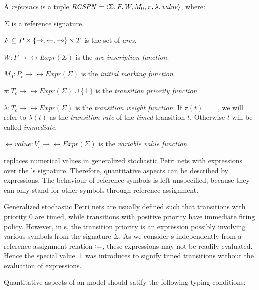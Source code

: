 \begin{dfn}
  \label{dfn:rgspn:rgspn}
  A \emph{reference } is a tuple \(\textrm{\itshape RGSPN\/} = \langle \Sigma, F, W, M_0, \pi, \lambda, \textrm{\itshape value\/} \rangle\), where:
  \begin{compactitem}
  \item \(\Sigma\) is a reference  signature.
  \item \(F \subseteq P \times \{\rightarrow, \leftarrow, \multimap\} \times T\) is the set of \emph{arcs}.
  \item \(W\colon F \to \rel{Expr}(\Sigma)\) is the \emph{arc inscription function}.
  \item \(M_0\colon P_c \to \rel{Expr}(\Sigma)\) is the \emph{initial marking function}.
  \item \(\pi\colon T_c \to \rel{Expr}(\Sigma) \cup \{\bot\}\) is the \emph{transition priority function}.
  \item \(\lambda\colon T_c \to \rel{Expr}(\Sigma)\) is the \emph{transition weight function}. If \(\pi(t) = \bot\), we will refer to \(\lambda(t)\) as the \emph{transition rate} of the \emph{timed} transition \(t\). Otherwise \(t\) will be called \emph{immediate}.
  \item \(\rel{value}\colon V_c \to \rel{Expr}(\Sigma)\) is the \emph{variable value function}.
  \end{compactitem}
\end{dfn}

 replaces numerical values in generalized stochastic Petri nets with expressions over the 's signature. Therefore, quantitative aspects can be described by expressions. The behaviour of reference symbols is left unspecified, because they can only stand for other symbols through reference assignment.

Generalized stochastic Petri nets are usually defined such that transitions with priority 0 are timed, while transitions with positive priority have immediate firing policy. However, in s, the transition priority is an expression possibly involving various symbols from the signature \(\Sigma\). As we consider s independently from a reference assignment relation \(\coloneq\), these expressions may not be readily evaluated. Hence the special value \(\bot\) was introduces to signify timed transitions without the evaluation of expressions.

Quantitative aspects of an  model should satify the following typing conditions:

